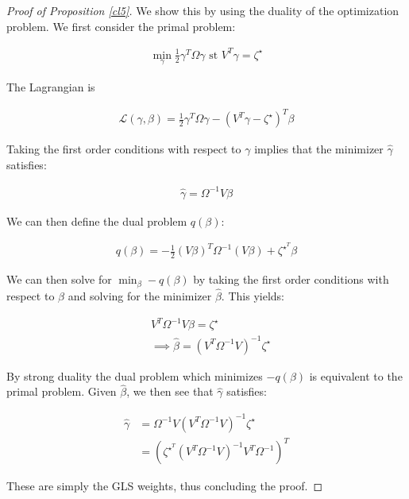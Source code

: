 \begin{proof}[Proof of Proposition \ref{cl5}]
    We show this by using the duality of the optimization problem. We first consider the primal problem:
    
    \begin{align*}
        \min_{\gamma} \frac{1}{2}\gamma^T\Omega\gamma \text{ st } V^T\gamma = \zeta^\star
    \end{align*}
    
    The Lagrangian is
    
    \begin{align*}
        \mathcal{L}(\gamma, \beta) = \frac{1}{2}\gamma^T\Omega\gamma - (V^T\gamma - \zeta^\star)^T\beta
    \end{align*}
    
    Taking the first order conditions with respect to $\gamma$ implies that the minimizer $\hat{\gamma}$ satisfies:
    
    \begin{align*}
        \hat{\gamma} = \Omega^{-1}V\beta
    \end{align*}

    We can then define the dual problem $q(\beta)$:
    
    \begin{align*}
        q(\beta) = -\frac{1}{2}(V\beta)^T\Omega^{-1}(V\beta) + \zeta^\star^T\beta
    \end{align*}
    
    We can then solve for $\min_{\beta} -q(\beta)$ by taking the first order conditions with respect to $\beta$ and solving for the minimizer $\hat{\beta}$. This yields:
    
    \begin{align*}
        & V^T\Omega^{-1}V\beta = \zeta^\star \\
        &\implies \hat{\beta} = (V^T\Omega^{-1}V)^{-1}\zeta^\star
    \end{align*}
    
    By strong duality the dual problem which minimizes $-q(\beta)$ is equivalent to the primal problem. Given $\hat{\beta}$, we then see that $\hat{\gamma}$ satisfies:
    
    \begin{align*}
        \hat{\gamma} &= \Omega^{-1}V(V^T\Omega^{-1}V)^{-1}\zeta^\star \\
        &= (\zeta^\star^T(V^T\Omega^{-1}V)^{-1}V^T\Omega^{-1})^T
    \end{align*}
    
    These are simply the GLS weights, thus concluding the proof.
\end{proof}


